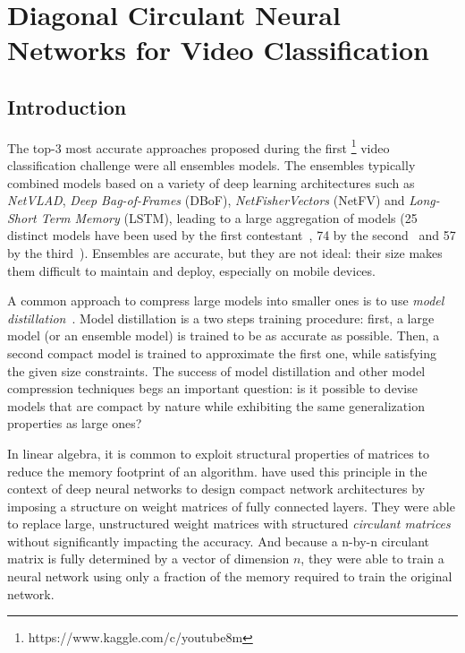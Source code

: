 \chapter{Diagonal Circulant Neural Networks for Video Classification}
\label{chapter:diagonal_circulant_neural_networks_for_video_classification}
\localtableofcontents


\section{Introduction}
\label{section:ch4-intro}

The top-3 most accurate approaches proposed during the first \yt\footnote{https://www.kaggle.com/c/youtube8m} video classification challenge  were all ensembles models.
The ensembles typically combined models based on a variety of deep learning architectures such as \emph{NetVLAD}, \emph{Deep Bag-of-Frames} (DBoF), \emph{NetFisherVectors} (NetFV) and \emph{Long-Short Term Memory} (LSTM), leading to a large aggregation of models (25 distinct models have been used by the first contestant~\cite{miech2017learnable}, 74 by the second~\cite{DBLP:journals/corr/WangZW17} and 57 by the third~\cite{DBLP:journals/corr/LiGLBLLLZW17}).
Ensembles are accurate, but they are not ideal: their size makes them difficult to maintain and deploy, especially on mobile devices. 

A common approach to compress large models into smaller ones is to use \emph{model distillation}~\cite{44873}.
Model distillation is a two steps training procedure: first, a large model (or an ensemble model) is trained to be as accurate as possible.
Then, a second compact model is trained to approximate the first one, while satisfying the given size constraints.
The success of model distillation and other model compression techniques begs an important question: is it possible to devise models that are compact by nature while exhibiting the same generalization properties as large ones?

In linear algebra, it is common to exploit structural properties of matrices to reduce the memory footprint of an algorithm. 
\citet{cheng} have used this principle in the context of deep neural networks to design compact network architectures by imposing a structure on weight matrices of fully connected layers.
They were able to replace large, unstructured weight matrices with structured \emph{circulant matrices} without significantly impacting the accuracy.
And because a n-by-n circulant matrix is fully determined by a vector of dimension $n$, they were able to train a neural network using only a fraction of the memory required to train the original network.

